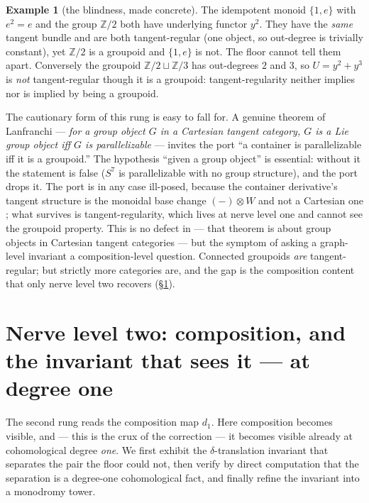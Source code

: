 \documentclass[11pt]{article}
\theoremstyle{definition}
\newtheorem{example}[theorem]{Example}
\newcommand{\Z}{\mathbb{Z}}
\begin{document}
\begin{example}[the blindness, made concrete]\label{ex:lvl1}
The idempotent monoid $\{1,e\}$ with $e^2=e$ and the group $\Z/2$ both have underlying functor $y^2$.
They have the \emph{same} tangent bundle and are both tangent-regular (one object, so out-degree is
trivially constant), yet $\Z/2$ is a groupoid and $\{1,e\}$ is not. The floor cannot tell them apart.
Conversely the groupoid $\Z/2\sqcup\Z/3$ has out-degrees $2$ and $3$, so $U=y^2+y^3$ is \emph{not}
tangent-regular though it is a groupoid: tangent-regularity neither implies nor is implied by being a
groupoid.
\end{example}

The cautionary form of this rung is easy to fall for. A genuine theorem of Lanfranchi
\cite[Thm.~4.20]{Lanfranchi2026} --- \emph{for a group object $G$ in a Cartesian tangent category, $G$
is a Lie group object iff $G$ is parallelizable} --- invites the port ``a container is parallelizable
iff it is a groupoid.'' The hypothesis ``given a group object'' is essential: without it the statement
is false ($S^7$ is parallelizable with no group structure), and the port drops it. The port is in any
case ill-posed, because the container derivative's tangent structure is the monoidal base change
$(-)\otimes W$ and not a Cartesian one \cite{MacBethParallel}; what survives is tangent-regularity,
which lives at nerve level one and cannot see the groupoid property. This is no defect in
\cite{Lanfranchi2026} --- that theorem is about group objects in Cartesian tangent categories --- but
the symptom of asking a graph-level invariant a composition-level question. Connected groupoids
\emph{are} tangent-regular; but strictly more categories are, and the gap is the composition content
that only nerve level two recovers (\S\ref{sec:lvl2}).

\section{Nerve level two: composition, and the invariant that sees it --- at degree one}
\label{sec:lvl2}

The second rung reads the composition map $d_1$. Here composition becomes visible, and --- this is the
crux of the correction --- it becomes visible already at cohomological degree \emph{one}. We first
exhibit the $\delta$-translation invariant that separates the pair the floor could not, then verify by
direct computation that the separation is a degree-one cohomological fact, and finally refine the
invariant into a monodromy tower.
\end{document}
